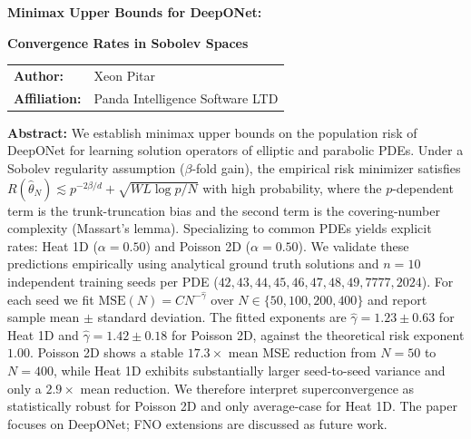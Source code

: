 \documentclass[12pt,a4paper]{article}
\begin{document}
\begin{titlepage}
    \centering
    \vspace*{2cm}

    {\LARGE\bfseries Minimax Upper Bounds for DeepONet:\par}
    {\LARGE\bfseries Convergence Rates in Sobolev Spaces\par}
    \vspace{2cm}

    \begin{tabular}{ll}
        \textbf{Author:} & Xeon Pitar \\
        \textbf{Affiliation:} & Panda Intelligence Software LTD
    \end{tabular}
    \vspace{2cm}

    \parbox{0.9\textwidth}{\small
        \textbf{Abstract:} We establish minimax upper bounds on the population risk of
        DeepONet for learning solution operators of elliptic and parabolic PDEs.
        Under a Sobolev regularity assumption ($\beta$-fold gain), the empirical risk
        minimizer satisfies
        $R(\hat\theta_N) \lesssim p^{-2\beta/d} + \sqrt{WL\log p/N}$
        with high probability, where the $p$-dependent term is the trunk-truncation
        bias and the second term is the covering-number complexity
        (Massart's lemma).
        Specializing to common PDEs yields explicit rates:
        Heat 1D ($\alpha=0.50$) and Poisson 2D ($\alpha=0.50$).
        We validate these predictions empirically using analytical ground truth
        solutions and $n=10$ independent training seeds per PDE
        ($42,43,44,45,46,47,48,49,7777,2024$).  For each seed we fit
        $\mathrm{MSE}(N)=C N^{-\hat\gamma}$ over $N \in \{50,100,200,400\}$ and
        report sample mean $\pm$ standard deviation.  The fitted exponents are
        $\hat\gamma = 1.23 \pm 0.63$ for Heat 1D and $\hat\gamma = 1.42 \pm 0.18$
        for Poisson 2D, against the theoretical risk exponent $1.00$.
        Poisson 2D shows a stable $17.3\times$ mean MSE reduction from $N=50$ to
        $N=400$, while Heat 1D exhibits substantially larger seed-to-seed variance
        and only a $2.9\times$ mean reduction.  We therefore interpret
        superconvergence as statistically robust for Poisson 2D and only
        average-case for Heat 1D.
        The paper focuses on DeepONet; FNO extensions are discussed as future work.
    }
\end{titlepage}
\end{document}
